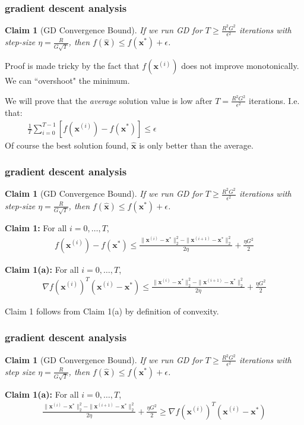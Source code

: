 \documentclass[compress]{beamer}
\newcommand{\bs}[1]{\boldsymbol{#1}}
\newcommand{\bv}[1]{\mathbf{#1}}
\newtheorem{claim}[theorem]{Claim}
\begin{document}
\begin{frame}[t]
	\frametitle{gradient descent analysis}
	\begin{claim}[GD Convergence Bound]
		If we run GD for $T \geq \frac{R^2G^2}{\epsilon^2}$ iterations with step-size $\eta = \frac{R}{G\sqrt{T}}$, then $f(\hat{\bv{x}}) \leq f(\bv{x}^*) + \epsilon$.
	\end{claim}

	Proof is made tricky by the fact that $f(\bv{x}^{(i)})$ does not improve monotonically. We can ``overshoot" the minimum. 
	
	We will prove that the \emph{average} solution value is low after $T = \frac{R^2G^2}{\epsilon^2}$ iterations. I.e. that:
	\begin{align*}
		\frac{1}{T}\sum_{i=0}^{T-1}\left[f(\bv{x}^{(i)}) - f(\bv{x}^*)\right]  \leq \epsilon \hspace{15em}
	\end{align*}
Of course the best solution found, $\hat{\bv{x}}$ is only better than the average.
\end{frame}

\begin{frame}[t]
	\frametitle{gradient descent analysis}
	\small
	\begin{claim}[GD Convergence Bound]
		If we run GD for $T \geq \frac{R^2G^2}{\epsilon^2}$ iterations with step-size $\eta = \frac{R}{G\sqrt{T}}$, then $f(\hat{\bv{x}}) \leq f(\bv{x}^*) + \epsilon$.
	\end{claim}
	\textbf{Claim 1:} For all $i = 0, \ldots, T$, 
	\begin{align*}
		f(\bv{x}^{(i)}) - f(\bv{x}^*) \leq \frac{\|\bs{x}^{(i)} - \bs{x}^*\|_2^2 - \|\bs{x}^{(i+1)} -\bs{x}^*\|_2^2}{2\eta} + \frac{\eta G^2}{2}
	\end{align*}
	
	\textbf{Claim 1(a):} For all $i = 0, \ldots, T$, 
	\begin{align*}
		\nabla f(\bv{x}^{(i)})^T(\bs{x}^{(i)} - \bs{x}^{*})  \leq \frac{\|\bs{x}^{(i)} - \bs{x}^*\|_2^2 - \|\bs{x}^{(i+1)} -\bs{x}^*\|_2^2}{2\eta} + \frac{\eta G^2}{2}
	\end{align*}
	
	Claim 1 follows from Claim 1(a) by definition of convexity.
\end{frame}

\begin{frame}[t]
	\frametitle{gradient descent analysis}
	\small
	\begin{claim}[GD Convergence Bound]
		If we run GD for $T \geq \frac{R^2G^2}{\epsilon^2}$ iterations with step size $\eta = \frac{R}{G\sqrt{T}}$, then $f(\hat{\bv{x}}) \leq f(\bv{x}^*) + \epsilon$.
	\end{claim}
	\textbf{Claim 1(a):} For all $i = 0, \ldots, T$, 
	\begin{align*}
		 \frac{\|\bv{x}^{(i)} - \bv{x}^*\|_2^2 - \|\bv{x}^{(i+1)} -\bv{x}^*\|_2^2}{2\eta} + \frac{\eta G^2}{2} \geq \nabla f(\bv{x}^{(i)})^T(\bv{x}^{(i)} - \bv{x}^{*})
	\end{align*}
\end{frame}
\end{document}
